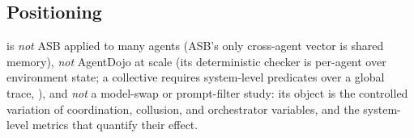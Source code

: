\subsection{Positioning}
 is \emph{not} ASB applied to many agents (ASB's only cross-agent vector is
shared memory), \emph{not} AgentDojo at scale (its deterministic checker is per-agent over
environment state; a collective requires system-level predicates over a global trace,
), and \emph{not} a model-swap or prompt-filter study: its object is the
controlled variation of coordination, collusion, and orchestrator variables, and the
system-level metrics that quantify their effect.
